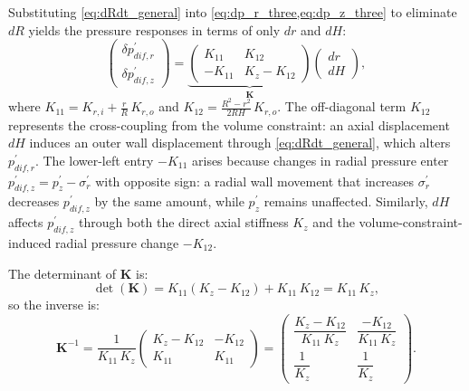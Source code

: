 Substituting \cref{eq:dRdt_general} into \cref{eq:dp_r_three,eq:dp_z_three} to eliminate $dR$ yields the pressure responses in terms of only $dr$ and $dH$:
\begin{equation}
\begin{pmatrix} \delta p_{dif,r}^{\prime} \\[4pt] \delta p_{dif,z}^{\prime} \end{pmatrix}
=
\underbrace{\begin{pmatrix} K_{11} & K_{12} \\[8pt] -K_{11} & K_z - K_{12} \end{pmatrix}}_{\mathbf{K}}
\begin{pmatrix} dr \\[4pt] dH \end{pmatrix},
\label{eq:stiffness_matrix}
\end{equation}
where $K_{11}=K_{r,i}+\frac{r}{R}\,K_{r,o}$ and $K_{12}=\frac{R^2-r^2}{2RH}\,K_{r,o}$. The off-diagonal term $K_{12}$ represents the cross-coupling from the volume constraint: an axial displacement $dH$ induces an outer wall displacement through \cref{eq:dRdt_general}, which alters $p_{dif,r}^{\prime}$. The lower-left entry $-K_{11}$ arises because changes in radial pressure enter $p_{dif,z}^{\prime}=p_z^{\prime}-\sigma_r^{\prime}$ with opposite sign: a radial wall movement that increases $\sigma_r^{\prime}$ decreases $p_{dif,z}^{\prime}$ by the same amount, while $p_z^{\prime}$ remains unaffected. Similarly, $dH$ affects $p_{dif,z}^{\prime}$ through both the direct axial stiffness $K_z$ and the volume-constraint-induced radial pressure change $-K_{12}$.

The determinant of $\mathbf{K}$ is:
\begin{equation}
\det(\mathbf{K}) = K_{11}(K_z - K_{12}) + K_{11}\,K_{12} = K_{11}\,K_z,
\label{eq:det_K}
\end{equation}
so the inverse is:
\begin{equation}
\mathbf{K}^{-1}
=
\frac{1}{K_{11}\,K_z}
\begin{pmatrix} K_z-K_{12} & -K_{12} \\[6pt] K_{11} & K_{11} \end{pmatrix}
=
\begin{pmatrix} \dfrac{K_z-K_{12}}{K_{11}\,K_z} & \dfrac{-K_{12}}{K_{11}\,K_z} \\[10pt] \dfrac{1}{K_z} & \dfrac{1}{K_z} \end{pmatrix}.
\label{eq:stiffness_matrix_inv}
\end{equation}

